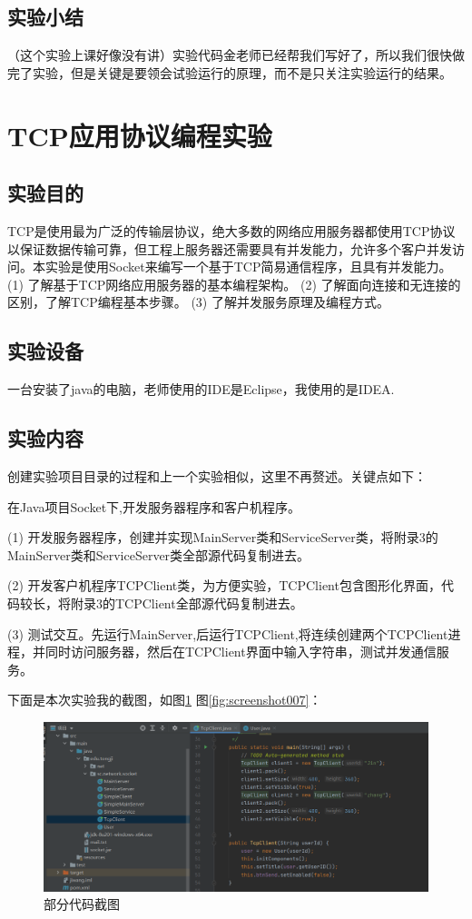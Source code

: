 \documentclass[lang=cn,11pt,a4paper,cite=authoryear]{elegantpaper}
\begin{document}
\subsection{实验小结}
（这个实验上课好像没有讲）实验代码金老师已经帮我们写好了，所以我们很快做完了实验，但是关键是要领会试验运行的原理，而不是只关注实验运行的结果。

\section{TCP应用协议编程实验}
\subsection{实验目的}
TCP是使用最为广泛的传输层协议，绝大多数的网络应用服务器都使用TCP协议以保证数据传输可靠，但工程上服务器还需要具有并发能力，允许多个客户并发访问。本实验是使用Socket来编写一个基于TCP简易通信程序，且具有并发能力。
(1)	了解基于TCP网络应用服务器的基本编程架构。
(2)	了解面向连接和无连接的区别，了解TCP编程基本步骤。
(3)	了解并发服务原理及编程方式。

\subsection{实验设备}
一台安装了java的电脑，老师使用的IDE是Eclipse，我使用的是IDEA.

\subsection{实验内容}
创建实验项目目录的过程和上一个实验相似，这里不再赘述。关键点如下：

在Java项目Socket下,开发服务器程序和客户机程序。

(1)	开发服务器程序，创建并实现MainServer类和ServiceServer类，将附录3的MainServer类和ServiceServer类全部源代码复制进去。

(2)	开发客户机程序TCPClient类，为方便实验，TCPClient包含图形化界面，代码较长，将附录3的TCPClient全部源代码复制进去。

(3)	测试交互。先运行MainServer,后运行TCPClient,将连续创建两个TCPClient进程，并同时访问服务器，然后在TCPClient界面中输入字符串，测试并发通信服务。

下面是本次实验我的截图，如图\ref{fig:screenshot008} 图\ref{fig:screenshot007}：

\begin{figure}[htbp]
	\centering
	\includegraphics[width=0.8\linewidth]{image/screenshot008}
	\caption{部分代码截图}
	\label{fig:screenshot008}
\end{figure}
\end{document}
